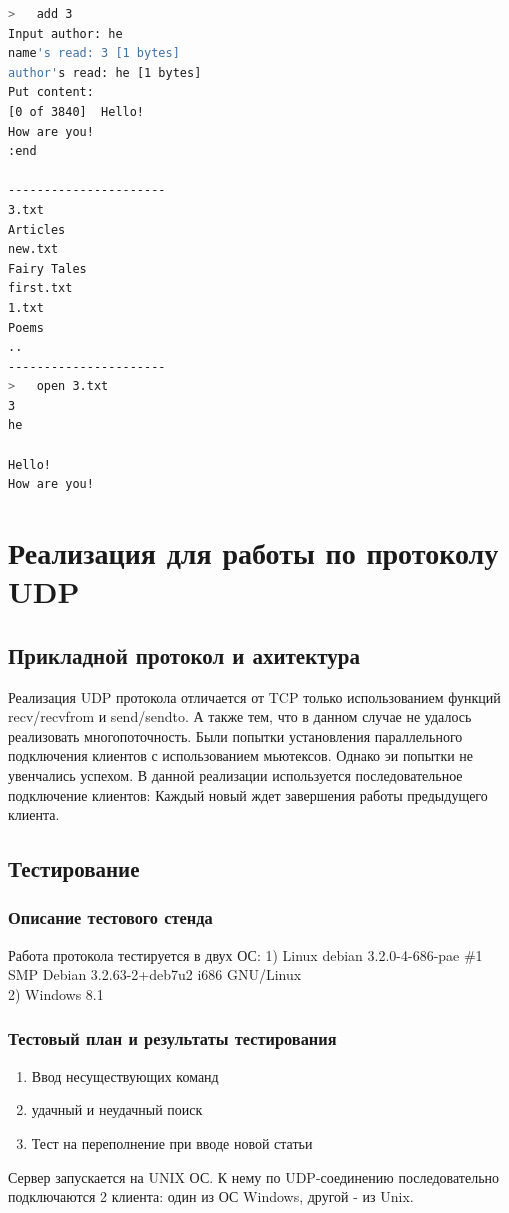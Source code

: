 \documentclass[12pt,a4paper]{report}
\begin{document}
\begin{lstlisting}[language=sh]
>   add 3
Input author: he
name's read: 3 [1 bytes]
author's read: he [1 bytes]
Put content:
[0 of 3840]  Hello!
How are you!
:end

----------------------
3.txt
Articles
new.txt
Fairy Tales
first.txt
1.txt
Poems
..
----------------------
>   open 3.txt
3
he

Hello!
How are you!
\end{lstlisting}

\chapter{Реализация для работы по протоколу UDP}
\section{Прикладной протокол и ахитектура}
Реализация UDP протокола отличается от TCP только использованием функций recv/recvfrom и send/sendto. А также тем, что в данном случае не удалось реализовать многопоточность. Были попытки установления параллельного подключения клиентов с использованием мьютексов. Однако эи попытки не увенчались успехом. В данной реализации используется последовательное подключение клиентов: Каждый новый ждет завершения работы предыдущего клиента.

\section{Тестирование}
\subsection{Описание тестового стенда}
Работа протокола тестируется в двух ОС:
1) Linux debian 3.2.0-4-686-pae \#1 SMP Debian 3.2.63-2+deb7u2 i686 GNU/Linux\\
2) Windows 8.1
\subsection{Тестовый план и результаты тестирования}

\begin{enumerate}
\item Ввод несуществующих команд
\item удачный и неудачный поиск
\item Тест на переполнение при вводе новой статьи
\end{enumerate}
Сервер запускается на UNIX ОС. К нему по UDP-соединению последовательно подключаются 2 клиента: один из ОС Windows, другой - из Unix.
\end{document}
